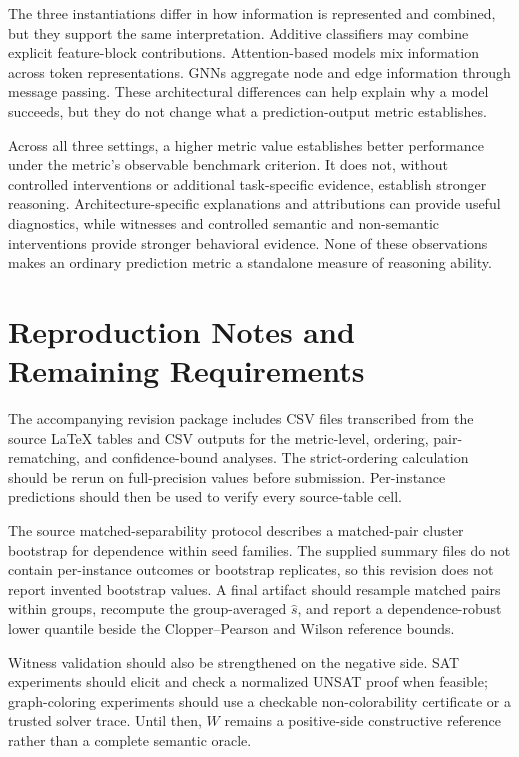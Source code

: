 \documentclass[acmsmall,screen,review,anonymous]{acmart}
\begin{document}
The three instantiations differ in how information is represented and
combined, but they support the same interpretation. Additive classifiers may
combine explicit feature-block contributions. Attention-based models mix
information across token representations. GNNs aggregate node and edge
information through message passing. These architectural differences can
help explain why a model succeeds, but they do not change what a
prediction-output metric establishes.

Across all three settings, a higher metric value establishes better
performance under the metric's observable benchmark criterion. It does not,
without controlled interventions or additional task-specific evidence,
establish stronger reasoning. Architecture-specific explanations and
attributions can provide useful diagnostics, while witnesses and controlled
semantic and non-semantic interventions provide stronger behavioral
evidence. None of these observations makes an ordinary prediction metric a
standalone measure of reasoning ability.

\section{Reproduction Notes and Remaining Requirements}
\label{sec:supp-reproduction}

The accompanying revision package includes CSV files transcribed from the
source LaTeX tables and CSV outputs for the metric-level, ordering,
pair-rematching, and confidence-bound analyses. The strict-ordering
calculation should be rerun on full-precision values before submission.
Per-instance predictions should then be used to verify every source-table
cell.

The source matched-separability protocol describes a matched-pair cluster
bootstrap for dependence within seed families. The supplied summary files do
not contain per-instance outcomes or bootstrap replicates, so this revision
does not report invented bootstrap values. A final artifact should resample
matched pairs within groups, recompute the group-averaged
\(\hat{s}\), and report a dependence-robust lower quantile beside the
Clopper--Pearson and Wilson reference bounds.

Witness validation should also be strengthened on the negative side.
SAT experiments should elicit and check a normalized UNSAT proof when
feasible; graph-coloring experiments should use a checkable non-colorability
certificate or a trusted solver trace. Until then, \(W\) remains a
positive-side constructive reference rather than a complete semantic oracle.



\end{document}
